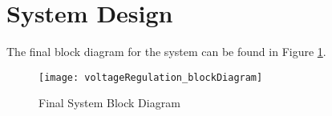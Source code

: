 \graphicspath{{content/2_design/figures}}

\section{System Design}

The final block diagram for the system can be found in Figure \ref{fig:voltageRegulation_blockDiagram}.

\begin{figure}[!htb]
  \centering
  \texttt{[image: voltageRegulation\_blockDiagram]}
  \caption{Final System Block Diagram}
  \label{fig:voltageRegulation_blockDiagram}
\end{figure}

\pagebreak